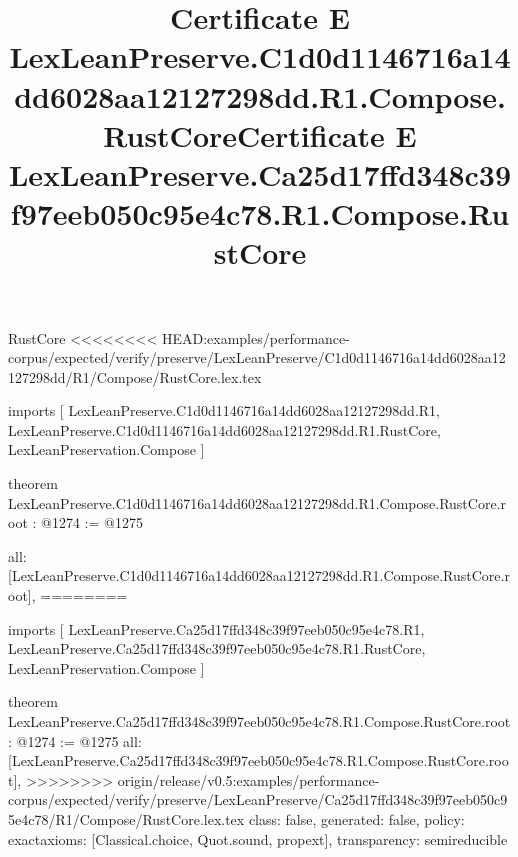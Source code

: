 \begin{lexlean}{RustCore}
<<<<<<<< HEAD:examples/performance-corpus/expected/verify/preserve/LexLeanPreserve/C1d0d1146716a14dd6028aa12127298dd/R1/Compose/RustCore.lex.tex
\title{Certificate E LexLeanPreserve.C1d0d1146716a14dd6028aa12127298dd.R1.Compose.RustCore}
\begin{coremodule}
imports [
  LexLeanPreserve.C1d0d1146716a14dd6028aa12127298dd.R1,
  LexLeanPreserve.C1d0d1146716a14dd6028aa12127298dd.R1.RustCore,
  LexLeanPreservation.Compose
]

theorem LexLeanPreserve.C1d0d1146716a14dd6028aa12127298dd.R1.Compose.RustCore.root : @1274 := @1275 {
  all: [LexLeanPreserve.C1d0d1146716a14dd6028aa12127298dd.R1.Compose.RustCore.root],
========
\title{Certificate E LexLeanPreserve.Ca25d17ffd348c39f97eeb050c95e4c78.R1.Compose.RustCore}
\begin{coremodule}
imports [
  LexLeanPreserve.Ca25d17ffd348c39f97eeb050c95e4c78.R1,
  LexLeanPreserve.Ca25d17ffd348c39f97eeb050c95e4c78.R1.RustCore,
  LexLeanPreservation.Compose
]

theorem LexLeanPreserve.Ca25d17ffd348c39f97eeb050c95e4c78.R1.Compose.RustCore.root : @1274 := @1275 {
  all: [LexLeanPreserve.Ca25d17ffd348c39f97eeb050c95e4c78.R1.Compose.RustCore.root],
>>>>>>>> origin/release/v0.5:examples/performance-corpus/expected/verify/preserve/LexLeanPreserve/Ca25d17ffd348c39f97eeb050c95e4c78/R1/Compose/RustCore.lex.tex
  class: false,
  generated: false,
  policy: exact{axioms: [Classical.choice, Quot.sound, propext]},
  transparency: semireducible
}


\end{coremodule}}
\end{coremodule}
\end{lexlean}
